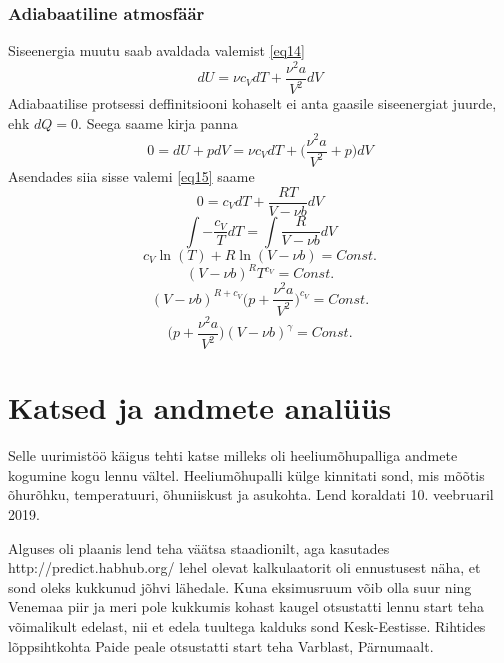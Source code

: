 \documentclass{trkut}%
\begin{document}
\subsection{Adiabaatiline atmosfäär}
Siseenergia muutu saab avaldada valemist \ref{eq14}
\begin{equation*}
dU = \nu c_VdT + \frac{\nu^2 a}{V^2}dV
\end{equation*}
Adiabaatilise protsessi deffinitsiooni kohaselt ei anta gaasile siseenergiat juurde, ehk $dQ = 0$. Seega saame kirja panna
\begin{equation*}
0 = dU + pdV = \nu c_V dT + \bigg( \frac{\nu^2 a}{V^2} + p \bigg) dV
\end{equation*}
Asendades siia sisse valemi \ref{eq15} saame
\begin{equation*}
0 = c_V dT + \frac{RT}{V - \nu b}dV
\end{equation*}
\begin{equation*}
\int - \frac{c_V}{T} dT = \int \frac{R}{V - \nu b}dV
\end{equation*}
\begin{equation*}
c_V \ln(T) + R \ln(V - \nu b) = Const.
\end{equation*}
\begin{equation*}
(V - \nu b)^R T^{c_V} = Const.
\end{equation*}
\begin{equation*}
(V - \nu b)^{R + c_V} \bigg( p + \frac{\nu^2 a}{V^2} \bigg)^{c_V} = Const.
\end{equation*}
\begin{equation*}
 \bigg( p + \frac{\nu^2 a}{V^2} \bigg) (V - \nu b)^\gamma = Const.
\end{equation*}


\chapter{Katsed ja andmete analüüs}

Selle uurimistöö käigus tehti katse milleks oli heeliumõhupalliga andmete kogumine kogu lennu vältel. Heeliumõhupalli külge kinnitati sond, mis mõõtis õhurõhku, temperatuuri, õhuniiskust ja asukohta. Lend koraldati 10. veebruaril 2019.

Alguses oli plaanis lend teha väätsa staadionilt, aga kasutades http://predict.habhub.org/ lehel olevat kalkulaatorit oli ennustusest näha, et sond oleks kukkunud jõhvi lähedale. Kuna eksimusruum võib olla suur ning Venemaa piir ja meri pole kukkumis kohast kaugel otsustatti lennu start teha võimalikult edelast, nii et edela tuultega kalduks sond Kesk-Eestisse. Rihtides lõppsihtkohta Paide peale otsustatti start teha Varblast, Pärnumaalt.
\end{document}
